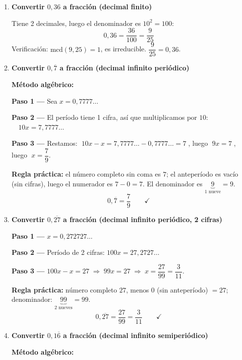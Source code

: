 \documentclass[11pt, letterpaper]{article}
\begin{document}
\begin{tcolorbox}[examplebox, title={Ejemplos --- convertir decimal a fracci\'on}]
\begin{enumerate}[label=\textbf{Ej. \arabic*.}, leftmargin=*, itemsep=16pt]

\item \textbf{Convertir $0{,}36$ a fracci\'on (decimal finito)}

Tiene 2 decimales, luego el denominador es $10^2=100$:
$$0{,}36 = \frac{36}{100} = \frac{9}{25}$$
Verificaci\'on: $\text{mcd}(9,25)=1$, es irreducible. $\dfrac{9}{25}=0{,}36$. \checkmark

\item \textbf{Convertir $0{,}\overline{7}$ a fracci\'on (decimal infinito peri\'odico)}

\textbf{M\'etodo alg\'ebrico:}

\textbf{Paso 1 ---} Sea $x = 0{,}7777\ldots$

\textbf{Paso 2 ---} El per\'iodo tiene 1 cifra, as\'i que multiplicamos por $10$: $\quad 10x = 7{,}7777\ldots$

\textbf{Paso 3 ---} Restamos: $\;10x - x = 7{,}7777\ldots - 0{,}7777\ldots = 7\;$, luego $\;9x = 7\;$, luego $\;x = \dfrac{7}{9}$.

\textbf{Regla pr\'actica:} el n\'umero completo sin coma es $7$; el anteper\'iodo es vac\'io (sin cifras), luego el numerador es $7-0=7$. El denominador es $\underbrace{9}_{1\text{ nueve}}=9$.
$$0{,}\overline{7} = \frac{7}{9} \qquad\checkmark$$

\item \textbf{Convertir $0{,}\overline{27}$ a fracci\'on (decimal infinito peri\'odico, 2 cifras)}

\textbf{Paso 1 ---} $x = 0{,}272727\ldots$

\textbf{Paso 2 ---} Per\'iodo de 2 cifras: $100x = 27{,}2727\ldots$

\textbf{Paso 3 ---} $100x - x = 27 \;\Rightarrow\; 99x = 27 \;\Rightarrow\; x = \dfrac{27}{99} = \dfrac{3}{11}$.

\textbf{Regla pr\'actica:} n\'umero completo $27$, menos $0$ (sin anteper\'iodo) $= 27$; denominador: $\underbrace{99}_{2\text{ nueves}}=99$.
$$0{,}\overline{27} = \frac{27}{99} = \frac{3}{11} \qquad\checkmark$$

\item \textbf{Convertir $0{,}1\overline{6}$ a fracci\'on (decimal infinito semiperi\'odico)}

\textbf{M\'etodo alg\'ebrico:}


\end{enumerate}
\end{tcolorbox}
\end{document}
